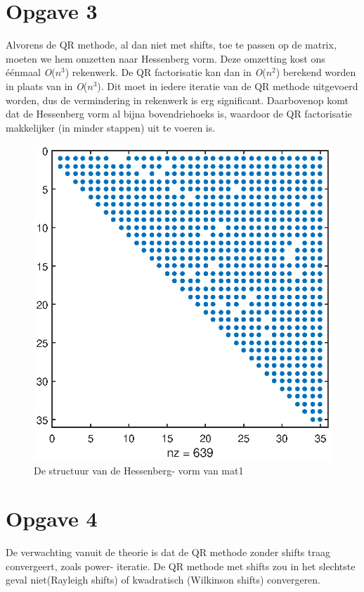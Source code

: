 \documentclass[]{article}
\newcommand{\opgave}[1]{\section*{Opgave #1}}
\begin{document}
\opgave3
Alvorens de QR methode, al dan niet met shifts, toe te passen op de matrix, moeten we hem omzetten naar Hessenberg vorm. Deze omzetting kost ons \'{e}\'{e}nmaal \textit{O}($n^3$) rekenwerk. \linebreak
De QR factorisatie kan dan in \textit{O}($n^2$) berekend worden in plaats van in \textit{O}($n^3$). Dit moet in iedere iteratie van de QR methode uitgevoerd worden, dus  de vermindering in rekenwerk is erg significant. Daarbovenop komt dat de Hessenberg vorm al bijna bovendriehoeks is, waardoor  de QR factorisatie makkelijker (in minder stappen) uit te voeren is.

\begin{figure}
\begin{center}
\includegraphics[width=1.4\textwidth]{opgave3.eps}
\end{center}
\caption{De structuur van de Hessenberg- vorm van mat1}
\end{figure}

\opgave4

De verwachting vanuit de theorie is dat de QR methode zonder shifts traag convergeert, zoals power- iteratie. De QR methode met shifts zou in het slechtste geval niet(Rayleigh shifts) of kwadratisch (Wilkinson shifts) convergeren.
\end{document}
